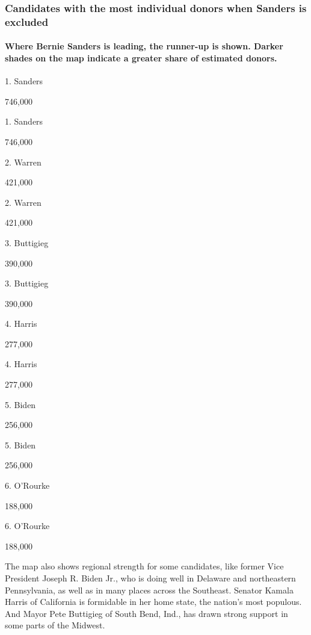 \hypertarget{candidates-with-the-most-individual-donors-when-sanders-is-excluded}{%
\subsubsection{Candidates with the most individual donors when Sanders
is
excluded}\label{candidates-with-the-most-individual-donors-when-sanders-is-excluded}}

\hypertarget{where-bernie-sanders-is-leading-the-runner-up-is-shown-darker-shades-on-the-map-indicate-a-greater-share-of-estimated-donors}{%
\paragraph{Where Bernie Sanders is leading, the runner-up is shown.
Darker shades on the map indicate a greater share of estimated
donors.}\label{where-bernie-sanders-is-leading-the-runner-up-is-shown-darker-shades-on-the-map-indicate-a-greater-share-of-estimated-donors}}

1. Sanders

746,000

1. Sanders

746,000

2. Warren

421,000

2. Warren

421,000

3. Buttigieg

390,000

3. Buttigieg

390,000

4. Harris

277,000

4. Harris

277,000

5. Biden

256,000

5. Biden

256,000

6. O'Rourke

188,000

6. O'Rourke

188,000

The map also shows regional strength for some candidates, like former
Vice President Joseph R. Biden Jr., who is doing well in Delaware and
northeastern Pennsylvania, as well as in many places across the
Southeast. Senator Kamala Harris of California is formidable in her home
state, the nation's most populous. And Mayor Pete Buttigieg of South
Bend, Ind., has drawn strong support in some parts of the Midwest.

